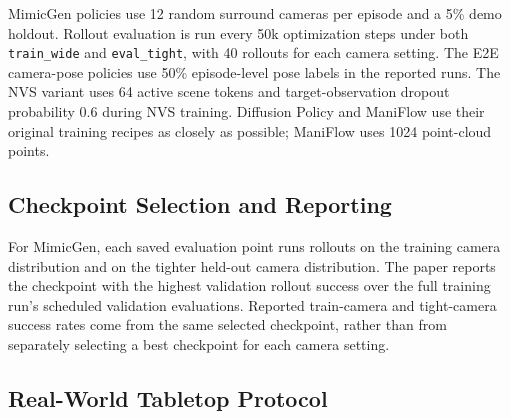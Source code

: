 MimicGen policies use 12 random surround cameras per episode and a 5\% demo
holdout.  Rollout evaluation is run every 50k optimization steps under
both \texttt{train\_wide} and \texttt{eval\_tight}, with 40 rollouts for each
camera setting.  The E2E camera-pose policies use 50\% episode-level pose
labels in the reported runs.  The NVS variant uses 64 active scene tokens and
target-observation dropout probability 0.6 during NVS training.  Diffusion
Policy and ManiFlow use their original training recipes as closely as possible;
ManiFlow uses 1024 point-cloud points.

\subsection{Checkpoint Selection and Reporting}
\label{sec:appendix-checkpoint-selection}

For MimicGen, each saved evaluation point runs rollouts on the training camera
distribution and on the tighter held-out camera distribution.  The paper reports
the checkpoint with the highest validation rollout success over the full
training run's scheduled validation evaluations.  Reported train-camera and
tight-camera success rates come from the same selected checkpoint, rather than
from separately selecting a best checkpoint for each camera setting.

\subsection{Real-World Tabletop Protocol}
\label{sec:appendix-realworld-protocol}

